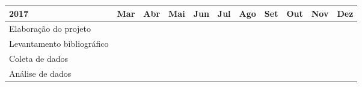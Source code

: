 \documentclass[oneside, 12pt,article, a4paper]{memoir}
\begin{document}
\begin{table}[!htb]
\footnotesize
\begin{tabular}{|p{4cm}|c|c|c|c|c|c|c|c|c|c|}
\hline
\textbf{2017}              & \multicolumn{1}{l|}{\textbf{Mar}} & \multicolumn{1}{l|}{\textbf{Abr}} & \multicolumn{1}{l|}{\textbf{Mai}} & \multicolumn{1}{l|}{\textbf{Jun}} & \multicolumn{1}{l|}{\textbf{Jul}} & \multicolumn{1}{l|}{\textbf{Ago}} & \multicolumn{1}{l|}{\textbf{Set}} & \multicolumn{1}{l|}{\textbf{Out}} & \multicolumn{1}{l|}{\textbf{Nov}} & \multicolumn{1}{l|}{\textbf{Dez}} \\ \hline
Elaboração do projeto      &                                   &                                   &                                   &                                   &                                   &                                   &                                   &                                   &                                   &                                   \\ \hline
Levantamento bibliográfico &                                   &                                   &                                   &                                   &                                   &                                   &                                   &                                   &                                   &                                   \\ \hline
Coleta de dados            &                                   &                                   &                                   &                                   &                                   &                                   &                                   &                                   &                                   &                                   \\ \hline
Análise de dados           &                                   &                                   &                                   &                                   &                                   &                                   &                                   &                                   &                                   &                                   \\ \hline
\end{tabular}
\end{table}
\end{document}
